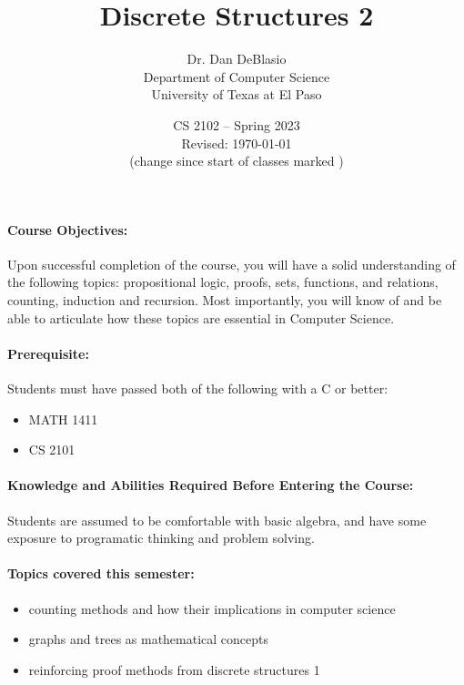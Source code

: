 \documentclass[12pt]{scrartcl}
\title{Discrete Structures 2}\let\Title\@title
\subtitle{
{\small
Dr. Dan DeBlasio\\
Department of Computer Science\\
University of Texas at El Paso\\
}
\vskip-1cm}
\date{\small CS 2102 -- Spring 2023\\ \vspace{1em}Revised: \today\\(change since start of classes marked \change{}{in orange})}
\begin{document}

\maketitle
%
%
\paragraph{Course Objectives:} Upon successful completion of the course, you will have a solid understanding of the following topics: propositional logic, proofs, sets, functions, and relations, counting, induction and recursion. Most importantly, you will know of and be able to articulate how these topics are essential in Computer Science.

\paragraph{Prerequisite:} Students must have passed both of the following with a C or better:
\begin{itemize}
\item MATH 1411
\item CS 2101
\end{itemize}

\paragraph{Knowledge and Abilities Required Before Entering the Course:} Students are assumed to be comfortable with basic algebra, and have some exposure to programatic thinking and problem solving. 

\paragraph{Topics covered this semester:}
\begin{itemize} 
\item counting methods and how their implications in computer science
\item graphs and trees as mathematical concepts
\item reinforcing proof methods from discrete structures 1  
\end{itemize}
\end{document}

